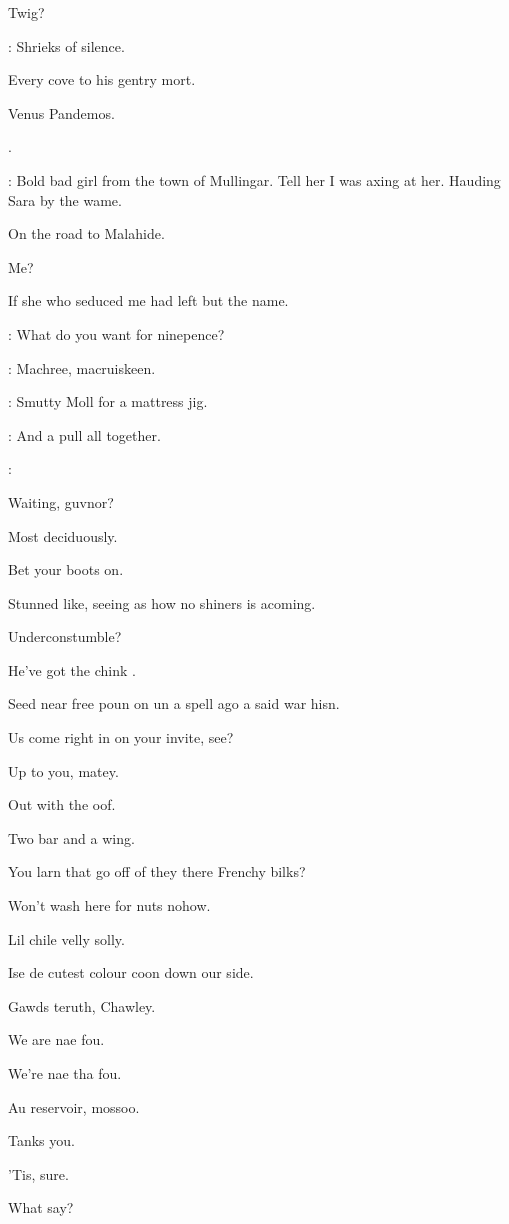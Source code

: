 Twig?

: Shrieks of silence.

Every cove to his gentry mort.

Venus Pandemos.

.

\bannon: Bold bad girl from the town of Mullingar.
Tell her I was axing at her.
Hauding Sara by the wame.

On the road to Malahide.

Me?

If she who seduced me had left but the name.

\lenehan: What do you want for ninepence?

\stephen: Machree, macruiskeen.

\lynch: Smutty Moll for a mattress jig.

\punch: And a pull all together.

\All: 


Waiting, guvnor?

Most deciduously.

Bet your boots on.

Stunned like, seeing as how no shiners is acoming.

Underconstumble?

He've got the chink .

Seed near free poun on un a spell ago a said war hisn.

Us come right in on your invite, see?

Up to you, matey.

Out with the oof.

Two bar and a wing.

You larn that go off of they there Frenchy bilks?

Won't wash here for nuts nohow.

Lil chile velly solly.

Ise de cutest colour coon down our side.

Gawds teruth, Chawley.

We are nae fou.

We're nae tha fou.

Au reservoir, mossoo.

Tanks you.


'Tis, sure.

What say?

